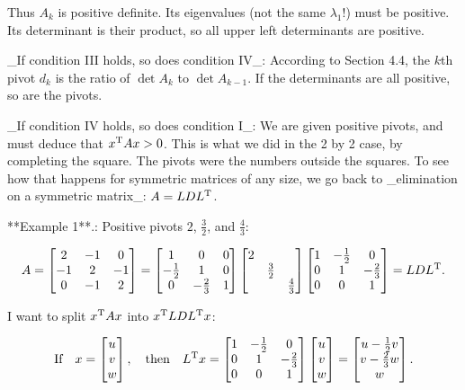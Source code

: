 Thus \(A_{k}\) is positive definite. Its eigenvalues (not the same \(\lambda_{1}\)!) must be positive. Its determinant is their product, so all upper left determinants are positive.

_If condition III holds, so does condition IV_: According to Section 4.4, the \(k\)th pivot \(d_{k}\) is the ratio of \(\det\!A_{k}\) to \(\det\!A_{k-1}\). If the determinants are all positive, so are the pivots.

_If condition IV holds, so does condition I_: We are given positive pivots, and must deduce that \(x^{\rm T}Ax>0\). This is what we did in the 2 by 2 case, by completing the square. The pivots were the numbers outside the squares. To see how that happens for symmetric matrices of any size, we go back to _elimination on a symmetric matrix_: \(A=LDL^{\rm T}\).

**Example 1**.: Positive pivots \(2\), \(\frac{3}{2}\), and \(\frac{4}{3}\):

\[A=\left[\begin{matrix}2&-1&0\\ -1&2&-1\\ 0&-1&2\end{matrix}\right]=\left[\begin{matrix}1&0&0\\ -\frac{1}{2}&1&0\\ 0&-\frac{2}{3}&1\end{matrix}\right]\left[\begin{matrix}2&&\\ &\frac{3}{2}&\\ &&\frac{4}{3}\end{matrix}\right]\left[\begin{matrix}1&-\frac{1}{2}&0\\ 0&1&-\frac{2}{3}\\ 0&0&1\end{matrix}\right]=LDL^{\rm T}.\]

I want to split \(x^{\rm T}Ax\) into \(x^{\rm T}LDL^{\rm T}x\):

\[\text{If}\quad x=\left[\begin{matrix}u\\ v\\ w\end{matrix}\right],\quad\text{then}\quad L^{\rm T}x=\left[\begin{matrix}1&- \frac{1}{2}&0\\ 0&1&-\frac{2}{3}\\ 0&0&1\end{matrix}\right]\left[\begin{matrix}u\\ v\\ w\end{matrix}\right]=\left[\begin{matrix}u-\frac{1}{2}v\\ v-\frac{2}{3}w\\ w\end{matrix}\right].\]

